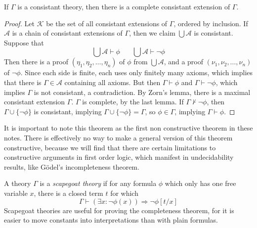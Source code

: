 \begin{lemma}[Lindenbaum]
    If $\Gamma$ is a consistant theory, then there is a complete consistant extension of $\Gamma$.
\end{lemma}
\begin{proof}
    Let $\mathcal{K}$ be the set of all consistant extensions of $\Gamma$, ordered by inclusion. If $\mathcal{A}$ is a chain of consistant extensions of $\Gamma$, then we claim $\bigcup \mathcal{A}$ is consistant. Suppose that
    \[ \bigcup \mathcal{A} \vdash \phi\ \ \ \ \ \ \ \ \bigcup \mathcal{A} \vdash \neg \phi \]
    Then there is a proof $(\eta_1, \eta_2, \dots, \eta_n)$ of $\phi$ from $\bigcup \mathcal{A}$, and a proof $(\nu_1, \nu_2, \dots, \nu_n)$ of $\neg \phi$. Since each side is finite, each uses only finitely many axioms, which implies that there is $\Gamma \in \mathcal{A}$ containing all axioms. But then $\Gamma \vdash \phi$ and $\Gamma \vdash \neg \phi$, which implies $\Gamma$ is not consistant, a contradiction. By Zorn's lemma, there is a maximal consistant extension $\Gamma$. $\Gamma$ is complete, by the last lemma. If $\Gamma \not \vdash \neg \phi$, then $\Gamma \cup \{ \neg \phi \}$ is consistant, implying $\Gamma \cup \{ \neg \phi \} = \Gamma$, so $\phi \in \Gamma$, implying $\Gamma \vdash \phi$.
\end{proof}

It is important to note this theorem as the first non constructive theorem in these notes. There is effectively no way to make a general version of this theorem constructive, because we will find that there are certain limitations to constructive arguments in first order logic, which manifest in undecidability results, like G\"{o}del's incompleteness theorem.

A theory $\Gamma$ is a \emph{scapegoat theory} if for any formula $\phi$ which only has one free variable $x$, there is a closed term $t$ for which
%
\[ \Gamma \vdash (\exists x: \neg \phi(x)) \Rightarrow \neg \phi[t/x] \]
%
Scapegoat theories are useful for proving the completeness theorem, for it is easier to move constants into interpretations than with plain formulas.

